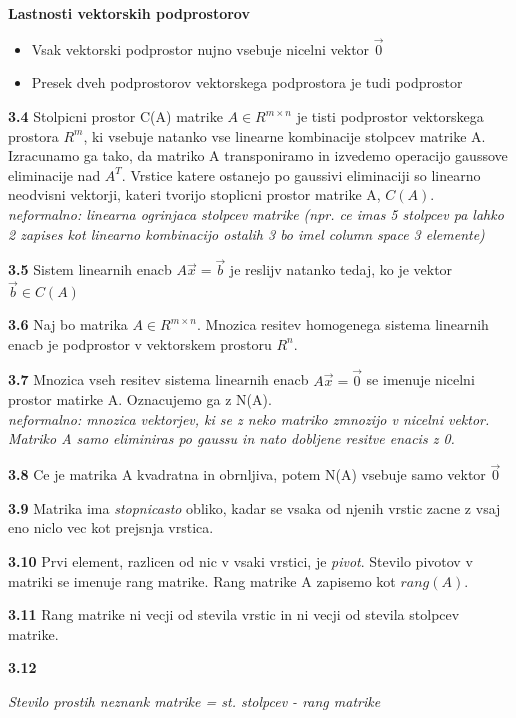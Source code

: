 \documentclass{article}
\begin{document}
\begin{multicols}{2}
\textbf{Lastnosti vektorskih podprostorov}
\begin{itemize}
	\item Vsak vektorski podprostor nujno vsebuje nicelni vektor $\vec{0}$
	\item Presek dveh podprostorov vektorskega podprostora je tudi podprostor
\end{itemize}

\textbf{3.4} Stolpicni prostor C(A) matrike $A \in R^{m \times n}$ je tisti podprostor
vektorskega prostora $R^{m}$, ki vsebuje natanko vse linearne kombinacije stolpcev matrike A.\\
Izracunamo ga tako, da matriko A transponiramo in izvedemo operacijo gaussove eliminacije nad $A^{T}$. Vrstice katere ostanejo po gaussivi eliminaciji
so linearno neodvisni vektorji, kateri tvorijo stoplicni prostor matrike A, $C(A)$.
\textit{neformalno: linearna ogrinjaca stolpcev matrike (npr. ce imas 5 stolpcev pa lahko 2 zapises kot linearno kombinacijo ostalih 3 bo imel column space 3 elemente)}

\textbf{3.5} Sistem linearnih enacb $A\vec{x} = \vec{b}$ je reslijv natanko tedaj, ko je vektor
$\vec{b} \in C(A)$

\textbf{3.6} Naj bo matrika $A \in R^{m \times n}$. Mnozica resitev homogenega sistema linearnih
enacb je podprostor v vektorskem prostoru $R^{n}$.

\textbf{3.7} Mnozica vseh resitev sistema linearnih enacb $A\vec{x} = \vec{0}$ se imenuje nicelni
prostor matirke A. Oznacujemo ga z N(A).\\
\textit{neformalno: mnozica vektorjev, ki se z neko matriko zmnozijo v nicelni vektor. Matriko A samo eliminiras po gaussu in nato dobljene resitve enacis z 0.}

\textbf{3.8} Ce je matrika A kvadratna in obrnljiva, potem N(A) vsebuje samo vektor $\vec{0}$

\textbf{3.9} Matrika ima \textit{stopnicasto} obliko, kadar se vsaka od njenih vrstic zacne z vsaj eno
niclo vec kot prejsnja vrstica.

\textbf{3.10} Prvi element, razlicen od nic v vsaki vrstici, je \textit{pivot}. Stevilo pivotov v matriki
se imenuje rang matrike. Rang matrike A zapisemo kot $rang(A)$.

\textbf{3.11} Rang matrike ni vecji od stevila vrstic in ni vecji od stevila stolpcev matrike.

\textbf{3.12}
\begin{center}
	\textit{Stevilo prostih neznank matrike = st. stolpcev - rang matrike}
\end{center}


\end{multicols}
\end{document}

